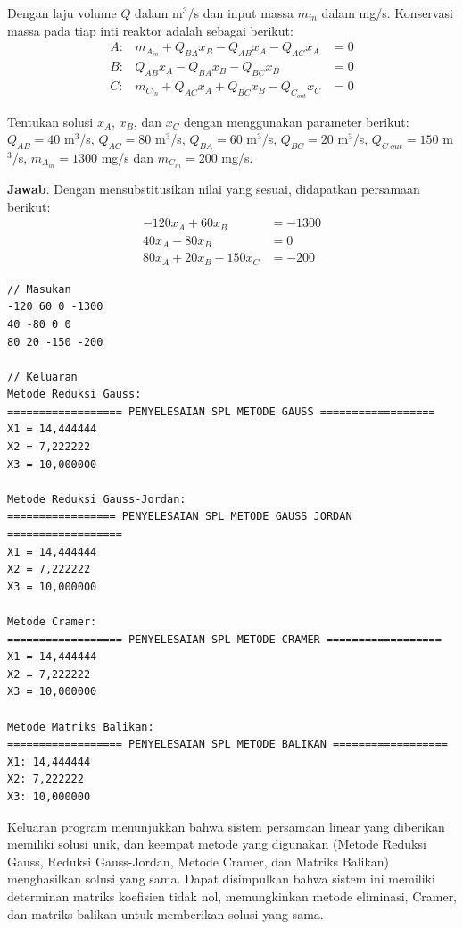 Dengan laju volume $Q$ dalam m$^3$/s dan input massa $m_{in}$ dalam mg/s. Konservasi massa pada tiap inti reaktor adalah sebagai berikut:\\

$$\begin{array}{rrl}
    A:& m_{A_{in}} + Q_{BA}x_B - Q_{AB}x_A - Q_{AC}x_A &= 0\\
    B:& Q_{AB}x_A - Q_{BA}x_B - Q_{BC}x_B &= 0\\
    C:& m_{C_{in}} + Q_{AC}x_A + Q_{BC}x_B - Q_{C_{out}} x_C &= 0
\end{array}$$

Tentukan solusi $x_A$, $x_B$, dan $x_C$ dengan menggunakan parameter berikut: $Q_{AB} = 40$ m$^3$/s, $Q_{AC} = 80$ m$^3$/s, $Q_{BA} = 60$ m$^3$/s, $Q_{BC} = 20$ m$^3$/s, $Q_{C \ out} = 150$ m$^3$/s, $m_{A_{in}} = 1300$ mg/s dan $m_{C_{in}} = 200$ mg/s.

\textbf{Jawab}. Dengan mensubstitusikan nilai yang sesuai, didapatkan persamaan berikut:
\begin{align*}
    -120x_A + 60x_B &= -1300\\
    40 x_A - 80x_B &= 0 \\
    80x_A + 20x_B - 150 x_C &= -200
\end{align*}

\begin{lstlisting}[caption = spl-4.txt]
// Masukan
-120 60 0 -1300
40 -80 0 0
80 20 -150 -200

// Keluaran
Metode Reduksi Gauss:
================== PENYELESAIAN SPL METODE GAUSS ==================
X1 = 14,444444
X2 = 7,222222
X3 = 10,000000

Metode Reduksi Gauss-Jordan:
================= PENYELESAIAN SPL METODE GAUSS JORDAN ==================
X1 = 14,444444
X2 = 7,222222
X3 = 10,000000

Metode Cramer:
================== PENYELESAIAN SPL METODE CRAMER ==================
X1 = 14,444444
X2 = 7,222222
X3 = 10,000000

Metode Matriks Balikan:
================== PENYELESAIAN SPL METODE BALIKAN ==================
X1: 14,444444
X2: 7,222222
X3: 10,000000\end{lstlisting}

Keluaran program menunjukkan bahwa sistem persamaan linear yang diberikan memiliki solusi unik, dan keempat metode yang digunakan (Metode Reduksi Gauss, Reduksi Gauss-Jordan, Metode Cramer, dan Matriks Balikan) menghasilkan solusi yang sama. Dapat disimpulkan bahwa sistem ini memiliki determinan matriks koefisien tidak nol, memungkinkan metode eliminasi, Cramer, dan matriks balikan untuk memberikan solusi yang sama.

